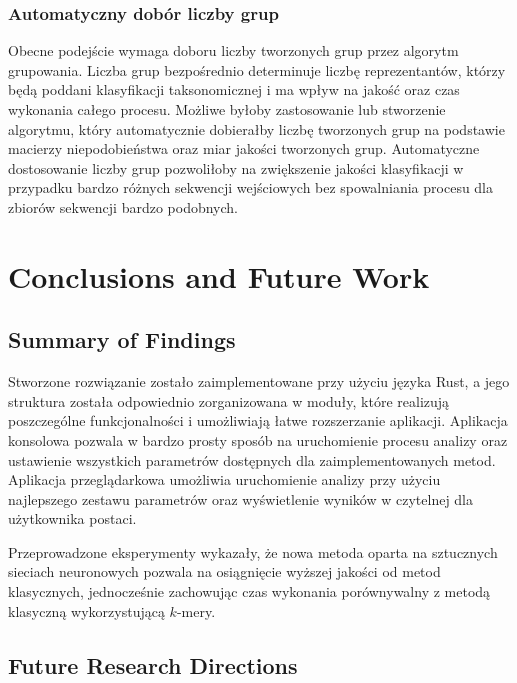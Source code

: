 \documentclass{article}
\newcommand{\temporary}[1]{
    \begin{tcolorbox}[colframe=red, colback=white, title={\textbf{WERSJA PO POLSKU}}, sharp corners=south]
        #1
    \end{tcolorbox}
}
\begin{document}
{        \subsubsection{Automatyczny dobór liczby grup}

            Obecne podejście wymaga doboru liczby tworzonych grup przez algorytm grupowania. Liczba grup bezpośrednio determinuje liczbę reprezentantów, którzy będą poddani klasyfikacji taksonomicznej i ma wpływ na jakość oraz czas wykonania całego procesu. Możliwe byłoby zastosowanie lub stworzenie algorytmu, który automatycznie dobierałby liczbę tworzonych grup na podstawie macierzy niepodobieństwa oraz miar jakości tworzonych grup. Automatyczne dostosowanie liczby grup pozwoliłoby na zwiększenie jakości klasyfikacji w przypadku bardzo różnych sekwencji wejściowych bez spowalniania procesu dla zbiorów sekwencji bardzo podobnych.
            }

    \clearpage
    \section{Conclusions and Future Work}

        \subsection{Summary of Findings}

            \temporary{
                Stworzone rozwiązanie zostało zaimplementowane przy użyciu języka Rust, a jego struktura została odpowiednio zorganizowana w moduły, które realizują poszczególne funkcjonalności i umożliwiają łatwe rozszerzanie aplikacji. Aplikacja konsolowa pozwala w bardzo prosty sposób na uruchomienie procesu analizy oraz ustawienie wszystkich parametrów dostępnych dla zaimplementowanych metod. Aplikacja przeglądarkowa umożliwia uruchomienie analizy przy użyciu najlepszego zestawu parametrów oraz wyświetlenie wyników w czytelnej dla użytkownika postaci.

                Przeprowadzone eksperymenty wykazały, że nowa metoda oparta na sztucznych sieciach neuronowych pozwala na osiągnięcie wyższej jakości od metod klasycznych, jednocześnie zachowując czas wykonania porównywalny z metodą klasyczną wykorzystującą $k$-mery.
            }

        \subsection{Future Research Directions}
\end{document}
